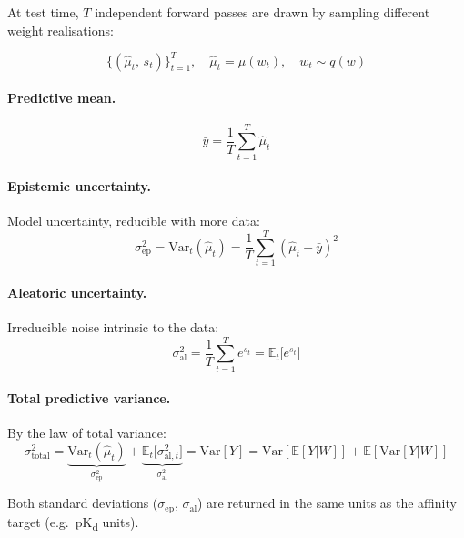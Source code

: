 \documentclass[11pt,a4paper]{article}
\begin{document}
At test time, $T$ independent forward passes are drawn by sampling different
weight realisations:

\begin{equation}
\bigl\{(\hat{\mu}_t,\, s_t)\bigr\}_{t=1}^{T}, \quad
\hat{\mu}_t = \hat{\mu}(w_t),\quad w_t \sim q(w)
\end{equation}

\paragraph{Predictive mean.}
\begin{equation}
\bar{y} = \frac{1}{T}\sum_{t=1}^{T} \hat{\mu}_t
\end{equation}

\paragraph{Epistemic uncertainty.}  Model uncertainty, reducible with more data:
\begin{equation}
\sigma_{\mathrm{ep}}^2
= \mathrm{Var}_t(\hat{\mu}_t)
= \frac{1}{T}\sum_{t=1}^{T}(\hat{\mu}_t - \bar{y})^2
\label{eq:epistemic}
\end{equation}

\paragraph{Aleatoric uncertainty.}  Irreducible noise intrinsic to the data:
\begin{equation}
\sigma_{\mathrm{al}}^2
= \frac{1}{T}\sum_{t=1}^{T} e^{s_t}
= \mathbb{E}_t\!\bigl[e^{s_t}\bigr]
\label{eq:aleatoric}
\end{equation}

\paragraph{Total predictive variance.}  By the law of total variance:
\begin{equation}
\sigma_{\mathrm{total}}^2
= \underbrace{\mathrm{Var}_t(\hat{\mu}_t)}_{\sigma_{\mathrm{ep}}^2}
+ \underbrace{\mathbb{E}_t\!\bigl[\sigma_{\mathrm{al},t}^2\bigr]}_{\sigma_{\mathrm{al}}^2}
= \mathrm{Var}[Y] = \mathrm{Var}[\mathbb{E}[Y|W]] + \mathbb{E}[\mathrm{Var}[Y|W]]
\label{eq:totalvar}
\end{equation}

Both standard deviations ($\sigma_{\mathrm{ep}}$, $\sigma_{\mathrm{al}}$) are
returned in the same units as the affinity target (e.g.\ pK\textsubscript{d} units).
\end{document}
